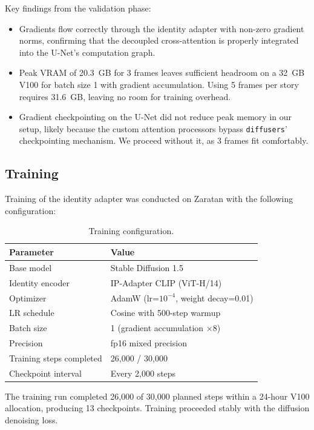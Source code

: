 \documentclass[11pt]{article}
\begin{document}
Key findings from the validation phase:
\begin{itemize}[leftmargin=*]
    \item Gradients flow correctly through the identity adapter with non-zero gradient norms, confirming that the decoupled cross-attention is properly integrated into the U-Net's computation graph.
    \item Peak VRAM of 20.3~GB for 3 frames leaves sufficient headroom on a 32~GB V100 for batch size 1 with gradient accumulation. Using 5 frames per story requires 31.6~GB, leaving no room for training overhead.
    \item Gradient checkpointing on the U-Net did not reduce peak memory in our setup, likely because the custom attention processors bypass \texttt{diffusers}' checkpointing mechanism. We proceed without it, as 3 frames fit comfortably.
\end{itemize}

\subsection{Training}

Training of the identity adapter was conducted on Zaratan with the following configuration:

\begin{table}[h]
\centering
\caption{Training configuration.}
\begin{tabular}{ll}
\toprule
\textbf{Parameter} & \textbf{Value} \\
\midrule
Base model & Stable Diffusion 1.5 \\
Identity encoder & IP-Adapter CLIP (ViT-H/14) \\
Optimizer & AdamW (lr=$10^{-4}$, weight decay=0.01) \\
LR schedule & Cosine with 500-step warmup \\
Batch size & 1 (gradient accumulation $\times 8$) \\
Precision & fp16 mixed precision \\
Training steps completed & 26,000 / 30,000 \\
Checkpoint interval & Every 2,000 steps \\
\bottomrule
\end{tabular}
\label{tab:training}
\end{table}

The training run completed 26,000 of 30,000 planned steps within a 24-hour V100 allocation, producing 13 checkpoints. Training proceeded stably with the diffusion denoising loss.
\end{document}

